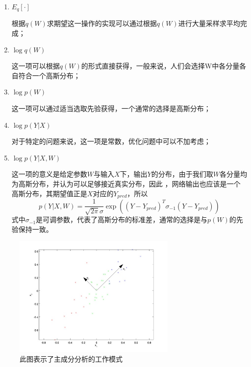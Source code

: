 \documentclass[aps,pre,12pt,preprint,onecolumn,showpacs,showkeys]{revtex4-1}
\begin{document}
\begin{enumerate}
    \item $E_q[\cdot]$\par 根据$q(W)$求期望这一操作的实现可以通过根据$q(W)$进行大量采样求平均完成；
    \item $\log q(W)$\par 这一项可以根据$q(W)$的形式直接获得，一般来说，人们会选择W中各分量各自符合一个高斯分布；
    \item $\log p(W)$\par 这一项可以通过适当选取先验获得，一个通常的选择是高斯分布；
    \item $\log p(Y|X)$\par 对于特定的问题来说，这一项是常数，优化问题中可以不加考虑；
    \item $\log p(Y | X, W)$\par 这一项的意义是给定参数$W$与输入$X$下，输出$Y$的分布，由于我们取$W$各分量均为高斯分布，并认为可以足够接近真实分布，因此
    ，网络输出也应该是一个高斯分布，其期望值正是$X$对应的$Y_{pred}$，所以
    \begin{equation}
        p(Y | X, W)=\frac{1}{\sqrt{2 \pi} \sigma} \exp \left(\left(Y-Y_{p r e d}\right)^{T} \sigma_{-1}\left(Y-Y_{p r e d}\right)\right)
    \end{equation}
    式中$\sigma_{-1}$是可调参数，代表了高斯分布的标准差，通常的选择是与$p(W)$的先验保持一致。
\end{enumerate}
\begin{figure}[htbp]
\centering
\includegraphics[width=80mm]{pca}
\caption{\label{fig:pca}%
此图表示了主成分分析的工作模式}
\end{figure}
\end{document}
